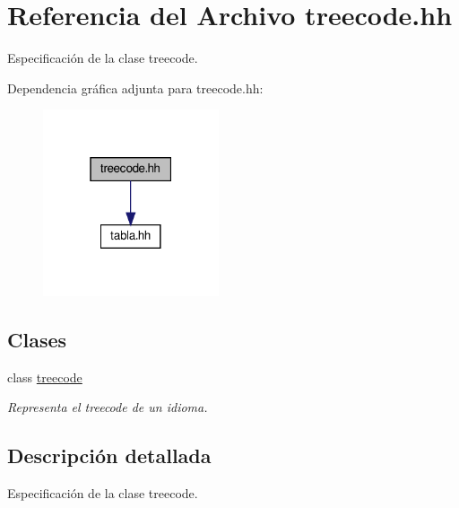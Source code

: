 \hypertarget{treecode_8hh}{}\section{Referencia del Archivo treecode.\+hh}
\label{treecode_8hh}


Especificación de la clase treecode.  


Dependencia gráfica adjunta para treecode.\+hh\+:\nopagebreak
\begin{figure}[H]
\begin{center}
\leavevmode
\includegraphics[width=147pt]{treecode_8hh__incl}
\end{center}
\end{figure}
\subsection*{Clases}
\begin{DoxyCompactItemize}
\item 
class \hyperlink{classtreecode}{treecode}
\begin{DoxyCompactList}\small\item\em Representa el treecode de un idioma. \end{DoxyCompactList}\end{DoxyCompactItemize}


\subsection{Descripción detallada}
Especificación de la clase treecode. 

